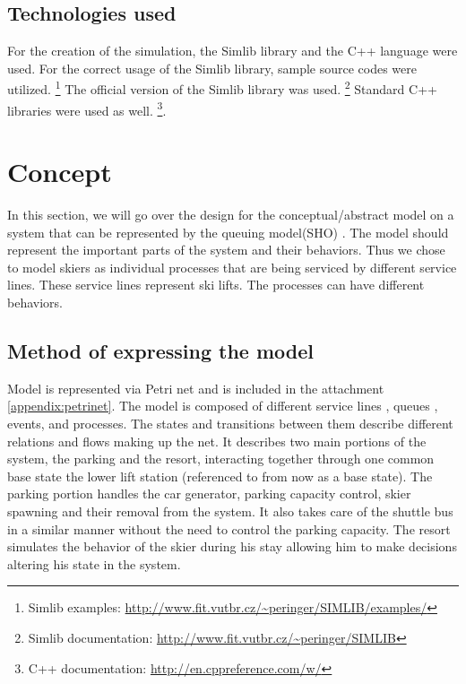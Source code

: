 \documentclass[11pt,a4paper]{article}
\begin{document}
\subsection{Technologies used}
For the creation of the simulation, the Simlib library and the C++ language were used. For the correct usage of the Simlib library, sample source codes were utilized.
\footnote{Simlib examples: \url{http://www.fit.vutbr.cz/~peringer/SIMLIB/examples/}}
The official version of the Simlib library was used.
\footnote{Simlib documentation: \url{http://www.fit.vutbr.cz/~peringer/SIMLIB}}
Standard C++ libraries were used as well. \footnote{C++ documentation: \url{http://en.cppreference.com/w/}}.

\section{Concept}
In this section, we will go over the design for the conceptual/abstract model \cite[slide 48]{slides} on a system that can be represented by the queuing model(SHO) \cite[slide 139]{slides}. The model should represent the important parts of the system and their behaviors. Thus we chose to model skiers as individual processes that are being serviced by different service lines. These service lines represent ski lifts. The processes can have different behaviors.


\subsection{Method of expressing the model}
Model is represented via Petri net \cite[slide 129]{slides} and is included in the attachment \ref{appendix:petrinet}. The model is composed of different service lines \cite[slide 149]{slides}, queues \cite[slide 141]{slides}, events\cite[slide 166]{slides}, and processes\cite[slide 139]{slides}.
The states and transitions between them describe different relations and flows making up the net. It describes two main portions of the system, the parking and the resort, interacting together through one common base state the lower lift station (referenced to from now as a base state). The parking portion handles the car generator, parking capacity control, skier spawning and their removal from the system. It also takes care of the shuttle bus in a similar manner without the need to control the parking capacity. \newline
The resort simulates the behavior of the skier during his stay allowing him to make decisions altering his state in the system. 
\end{document}
